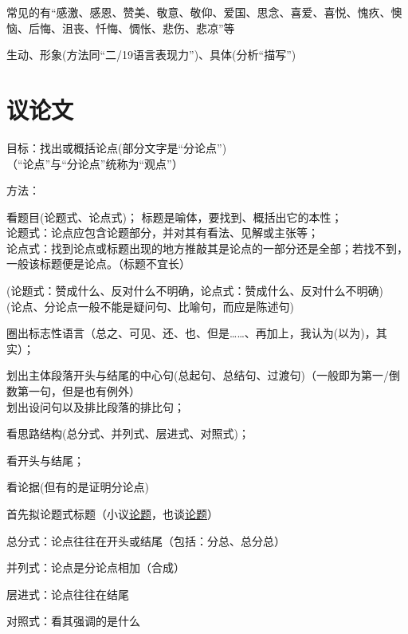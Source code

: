 {
  常见的有``感激、感恩、赞美、敬意、敬仰、爱国、思念、喜爱、喜悦、愧疚、懊恼、后悔、沮丧、忏悔、惆怅、悲伤、悲凉''等

  生动、形象(方法同``二/19语言表现力'')、具体(分析``描写'')

\section{议论文}
目标：找出或概括论点(部分文字是``分论点'')\\
（``论点''与``分论点''统称为``观点''）\par
方法：\begin{asparaenum}[(1)]\item 看题目(论题式、论点式)；
标题是喻体，要找到、概括出它的本性；\\
论题式：论点应包含论题部分，并对其有看法、见解或主张等；\\
论点式：找到论点或标题出现的地方推敲其是论点的一部分还是全部；若找不到，一般该标题便是论点。（标题不宜长）\par
(论题式：赞成什么、反对什么不明确，论点式：赞成什么、反对什么不明确)\\
(论点、分论点一般不能是疑问句、比喻句，而应是陈述句)

\item 圈出标志性语言（总之、可见、还、也、但是\ldots{}\ldots{}、再加上，我认为(以为)，其实）；
\item 划出主体段落开头与结尾的中心句(总起句、总结句、过渡句)（一般即为第一/倒数第一句，但是也有例外）\\划出设问句以及排比段落的排比句；
\item 看思路结构(总分式、并列式、层进式、对照式)；
\item 看开头与结尾；
\item 看论据(但有的是证明分论点)
\end{asparaenum}

\begin{asparaenum}
\item 首先拟论题式标题（小议\uline{论题}，也谈\uline{论题}）
\end{asparaenum}

\begin{asparaenum}[(1)]
\item 总分式：论点往往在开头或结尾（包括：分总、总分总）
\item 并列式：论点是分论点相加（合成）
\item 层进式：论点往往在结尾
\item 对照式：看其强调的是什么
\end{asparaenum}

}
